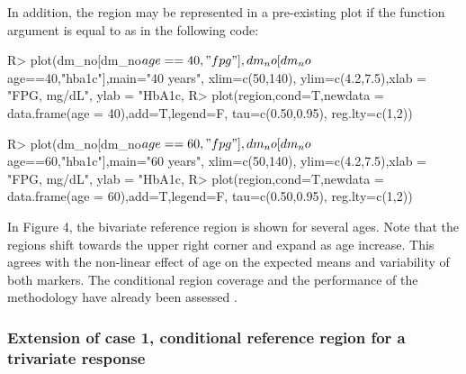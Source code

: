 In addition, the region may be represented in a pre-existing plot if the  function argument  is equal to  as in the following code:

\begin{example}
R> plot(dm_no[dm_no$age==40,"fpg"],dm_no[dm_no$age==40,"hba1c"],main="40 years",
   xlim=c(50,140), ylim=c(4.2,7.5),xlab = "FPG, mg/dL", ylab = "HbA1c, %
R> plot(region,cond=T,newdata = data.frame(age = 40),add=T,legend=F, tau=c(0.50,0.95),
   reg.lty=c(1,2))

R> plot(dm_no[dm_no$age==60,"fpg"],dm_no[dm_no$age==60,"hba1c"],main="60 years", 
   xlim=c(50,140), ylim=c(4.2,7.5),xlab = "FPG, mg/dL", ylab = "HbA1c, %
R> plot(region,cond=T,newdata = data.frame(age = 60),add=T,legend=F, tau=c(0.50,0.95),
   reg.lty=c(1,2))
\end{example}

In Figure 4, the bivariate reference region is shown for several ages. Note that the regions shift towards the upper right corner and expand as age increase. This agrees with the non-linear effect of age on the expected means and variability of both markers. The conditional region coverage and the performance of the methodology have already been assessed \citep{statmed}.


\subsubsection{Extension of case 1, conditional reference region for a trivariate response}

